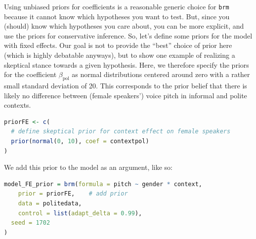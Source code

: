 \documentclass[nobib]{tufte-handout}
\begin{document}
Using unbiased priors for coefficients is a reasonable generic choice for \texttt{brm} because
it cannot know which hypotheses you want to test. But, since you (should) know which hypotheses
you care about, you can be more explicit, and use the priors for conservative inference. 
%
So,
let's define some priors for the model with fixed effects. Our goal is not to provide the
``best'' choice of prior here (which is highly debatable anyways), but to show one example of realizing
a skeptical stance towards a given hypothesis. Here, we therefore specify the priors for the
coefficient $\beta_{\text{pol}}$ as normal distributions centered around zero with a rather
small standard deviation of 20. This corresponds to the prior belief that there is likely no difference
between (female speakers') voice pitch in informal and polite contexts.
%
%

\begin{minipage}[]{1\textwidth}
\begin{lstlisting}[language=R]
priorFE <- c(
  # define skeptical prior for context effect on female speakers
  prior(normal(0, 10), coef = contextpol)
)
\end{lstlisting}
\end{minipage}

\vspace{-0.5cm}


We add this prior to the model as an argument, like so:
%

\begin{minipage}[]{1\textwidth}
\begin{lstlisting}[language=R]
model_FE_prior = brm(formula = pitch ~ gender * context,
	prior = priorFE, 	# add prior 
	data = politedata,
	control = list(adapt_delta = 0.99),
  seed = 1702
)    
\end{lstlisting}
\end{minipage}
\end{document}
